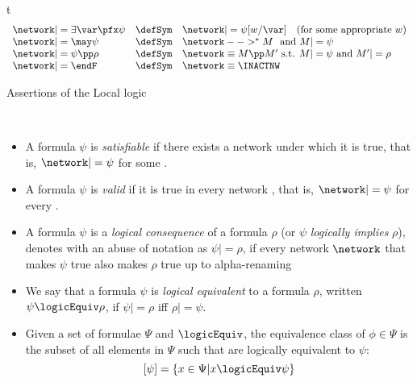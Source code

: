 \begin{myfigure}{t}
{\begin{displaymath}
\begin{array}{llllllllllllll}
         \network |= \exists\var\pfx\psi & \defSym & \network
         |= \psi[w/\var]\quad(\text{for some appropriate } w)      \\
         \network |= \may \psi & \defSym & \network
         -->^*M \ \text{ and } M |= \psi     \\
         \network |= \psi \pp \rho & \defSym & \network \equiv M \pp
         M'
         \text{ s.t. } M |= \psi \text{ and } M' |= \rho    \\
         \network |= \endF & \defSym & \network \equiv \INACTNW
    \end{array}
  \end{displaymath}  }
  \caption{Assertions of the Local logic}
  \label{Logic4Struct:table:local:assertions}
\end{myfigure}


\begin{definition}\
  \begin{itemize}
  \item A formula $\psi$ is \emph{satisfiable} if there exists a
    network under which it is true, that is, $\network |= \psi$ for some
    \network.
  \item A formula $\psi$ is \emph{valid} if it is true in every
    network \network, that is, $\network |= \psi$ for every
    \network.
  \item A formula $\psi$ is a \emph{logical consequence} of a formula
    $\rho$ (or $\psi$ \emph{logically implies} $\rho$), denotes with
    an abuse of notation as $\psi |= \rho$, if every network
    $\network$ that makes $\psi$ true also makes $\rho$ true up to alpha-renaming
  \item We say that a formula $\psi$ is \emph{logical equivalent} to
    a formula $\rho$, written $\psi \logicEquiv \rho$, if $\psi |= \rho$ iff
    $\rho |= \psi$.
    \item Given a set of formulae $\Psi$ and $\logicEquiv$, the
      equivalence class of $\phi \in \Psi$ is the subset of all
      elements in $\Psi$ such that are logically equivalent to $\psi$:
      \[
      [ \psi ] = \{ x \in \Psi | x \logicEquiv \psi \}
      \]
  \end{itemize}
\end{definition}


